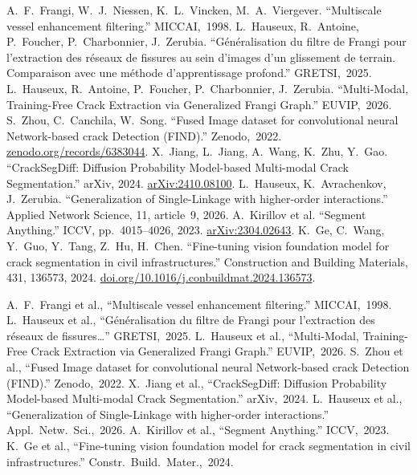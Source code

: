  {A.~F.~Frangi, W.~J.~Niessen, K.~L.~Vincken, M.~A.~Viergever.}
 {``Multiscale vessel enhancement filtering.'' MICCAI,~1998.}
 {L.~Hauseux, R.~Antoine, P.~Foucher, P.~Charbonnier, J.~Zerubia.}
 {``Généralisation du filtre de Frangi pour l'extraction des réseaux de fissures au sein d'images d'un glissement de terrain. Comparaison avec une méthode d'apprentissage profond.'' GRETSI,~2025.}
 {L.~Hauseux, R.~Antoine, P.~Foucher, P.~Charbonnier, J.~Zerubia.}
 {``Multi-Modal, Training-Free Crack Extraction via Generalized Frangi Graph.'' EUVIP,~2026.}
 {S.~Zhou, C.~Canchila, W.~Song.}
 {``Fused Image dataset for convolutional neural Network-based crack Detection (FIND).'' Zenodo,~2022. \href{https://zenodo.org/records/6383044}{zenodo.org/records/6383044}.}
 {X.~Jiang, L.~Jiang, A.~Wang, K.~Zhu, Y.~Gao.}
 {``CrackSegDiff: Diffusion Probability Model-based Multi-modal Crack Segmentation.'' arXiv, 2024. \href{https://arxiv.org/abs/2410.08100}{arXiv:2410.08100}.}
 {L.~Hauseux, K.~Avrachenkov, J.~Zerubia.}
 {``Generalization of Single-Linkage with higher-order interactions.'' Applied Network Science, 11, article~9, 2026.}
 {A.~Kirillov et al.}
 {``Segment Anything.'' ICCV, pp.~4015--4026, 2023. \href{https://arxiv.org/abs/2304.02643}{arXiv:2304.02643}.}
 {K.~Ge, C.~Wang, Y.~Guo, Y.~Tang, Z.~Hu, H.~Chen.}
 {``Fine-tuning vision foundation model for crack segmentation in civil infrastructures.'' Construction and Building Materials, 431, 136573, 2024. \href{https://doi.org/10.1016/j.conbuildmat.2024.136573}{doi.org/10.1016/j.conbuildmat.2024.136573}.}

 {A.~F.~Frangi et al., ``Multiscale vessel enhancement filtering.'' MICCAI,~1998.}
 {L.~Hauseux et al., ``Généralisation du filtre de Frangi pour l'extraction des réseaux de fissures\ldots'' GRETSI,~2025.}
 {L.~Hauseux et al., ``Multi-Modal, Training-Free Crack Extraction via Generalized Frangi Graph.'' EUVIP,~2026.}
 {S.~Zhou et al., ``Fused Image dataset for convolutional neural Network-based crack Detection (FIND).'' Zenodo,~2022.}
 {X.~Jiang et al., ``CrackSegDiff: Diffusion Probability Model-based Multi-modal Crack Segmentation.'' arXiv,~2024.}
 {L.~Hauseux et al., ``Generalization of Single-Linkage with higher-order interactions.'' Appl.~Netw.~Sci.,~2026.}
 {A.~Kirillov et al., ``Segment Anything.'' ICCV,~2023.}
 {K.~Ge et al., ``Fine-tuning vision foundation model for crack segmentation in civil infrastructures.'' Constr.~Build.~Mater.,~2024.}
